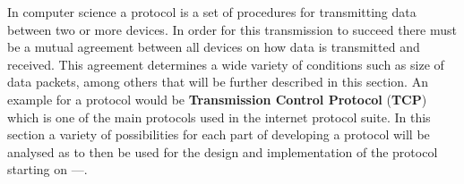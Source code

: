 In computer science a protocol is a set of procedures for transmitting data between two or more devices.
In order for this transmission to succeed there must be a mutual agreement between all devices on how data is transmitted and received.
This agreement determines a wide variety of conditions such as size of data packets, among others that will be further described in this section.
An example for a protocol would be \textbf{Transmission Control Protocol} (\textbf{TCP}) which is one of the main protocols used in the internet protocol suite.
In this section a variety of possibilities for each part of developing a protocol will be analysed as to then be used for the design and implementation of the protocol starting on ---.

